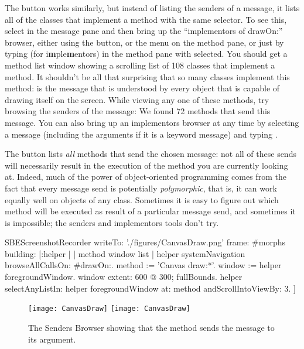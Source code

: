 \documentclass[a4paper,10pt,twoside]{book}
\begin{document}
The  button works similarly, but instead of listing the senders of a message, it lists all of the classes that implement a method with the same selector.
To see this, select  in the message pane and then bring up the ``implementors of drawOn:'' browser, either using the  button, or the  menu on the method pane, or just by typing  (for {i\textbf{m}ple\textbf{m}entors}) in the method pane with  selected.
You should get a method list window showing a scrolling list of 108 classes that implement a  method.
It shouldn't be all that surprising that so many classes implement this method:
 is the message that is understood by every object that is capable of drawing itself on the screen.
While viewing any one of these methods, try browsing the senders of the  message:
We found 72 methods that send this message.
You can also bring up an implementors browser at any time by selecting a message (including the arguments if it is a keyword message) and typing .

The  button lists \emph{all} methods that send the chosen message: not all of these sends will necessarily result in the execution of the method you are currently looking at.
Indeed, much of the power of object-oriented programming comes from the fact that every message send is potentially \emph{polymorphic}, that is, it can work equally well on objects of any class.  Sometimes it is easy to figure out which method will be executed as result of a particular message send, and sometimes it is impossible; the senders and implementors tools don't try.

\begin{ExecuteSmalltalkScript}
SBEScreenshotRecorder writeTo: './figures/CanvasDraw.png' frame: #morphs building: [:helper |
	| method window list |
	helper systemNavigation browseAllCallsOn: #drawOn:.
	method := 'Canvas draw:*'.
	window := helper foregroundWindow.
	window extent: 600 @ 300; fullBounds.
	helper selectAnyListIn: helper foregroundWindow at: method andScrollIntoViewBy: 3.
]
\end{ExecuteSmalltalkScript}
\begin{figure}[htbp]
	\begin{center}
   \ifluluelse
		{\texttt{[image: CanvasDraw]}}
		{\texttt{[image: CanvasDraw]}}
	\end{center}
	\caption{The Senders Browser showing that the  method sends the  message to its argument.	\label{fig:CanvasDraw}}
\end{figure}
\end{document}
